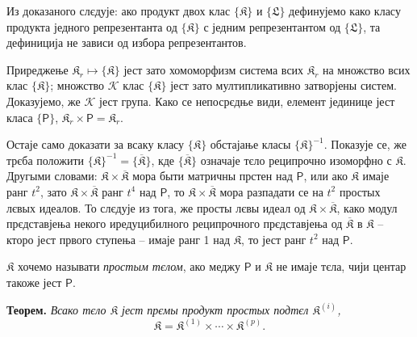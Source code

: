 \documentclass[11pt]{article}
\begin{document}
Из доказаного слєдује: ако продукт двох клас \(\{\mathfrak K\}\) и \(\{\mathfrak L\}\) дефинујемо како класу продукта једного репрезентанта од \(\{\mathfrak K\}\) с једним репрезентантом од \(\{\mathfrak L\}\), та дефиниција не зависи од избора репрезентантов.

Приреджење \(\mathfrak K_r\mapsto\{\mathfrak K\}\) јест зато хомоморфизм система всих \(\mathfrak K_r\) на множство всих клас \(\{\mathfrak K\}\); множство \(\mathscr K\) клас \(\{\mathfrak K\}\) јест зато мултипликативно затворјены систем. Доказујемо, же \(\mathscr K\) јест група. Како се непосрєдње види, елемент јединице јест класа \(\{\mathsf P\}\), \(\mathfrak K_r\times\mathsf P=\mathfrak K_r\).

Остаје само доказати за всаку класу \(\{\mathfrak K\}\) обстајање класы \(\{\mathfrak K\}^{-1}\). Показује се, же трєба положити \(\{\mathfrak K\}^{-1}=\{\overline{\mathfrak K}\}\), кде \(\{\overline{\mathfrak K}\}\) означаје тєло реципрочно изоморфно с \(\mathfrak K\). Другыми словами: \(\mathfrak K\times\overline{\mathfrak K}\) мора быти матричны прстен над \(\mathsf P\), или ако \(\mathfrak K\) имаје ранг \(t^2\), зато \(\mathfrak K\times\overline{\mathfrak K}\) ранг \(t^4\) над \(\mathsf P\), то \(\mathfrak K\times\overline{\mathfrak K}\) мора разпадати се на \(t^2\) простых лєвых идеалов. То слєдује из тога, же просты лєвы идеал од \(\mathfrak K\times\overline{\mathfrak K}\), како модул прєдставјења некого иредуцибилного реципрочного прєдставјења од \(\overline{\mathfrak K}\) в \(\mathfrak K\) -- кторо јест првого ступења -- имаје ранг 1 над \(\mathfrak K\), то јест ранг \(t^2\) над \(\mathsf P\).

\(\mathfrak K\) хочемо называти \emph{простым тєлом}, ако меджу \(\mathsf P\) и \(\mathfrak K\) не имаје тєла, чији центар такоже јест \(\mathsf P\).

\textbf{Теорем.} \emph{Всако тєло \(\mathfrak K\) јест прємы продукт простых подтєл \(\mathfrak K^{(i)}\),}
\[
\mathfrak K=\mathfrak K^{(1)}\times\cdots\times\mathfrak K^{(p)}.
\]
\end{document}
